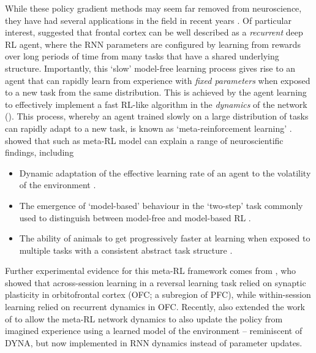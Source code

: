 While these policy gradient methods may seem far removed from neuroscience, they have had several applications in the field in recent years \citep{wang2018prefrontal, jensen2023recurrent, merel2019deep,li2022integrating,song2017reward}.
Of particular interest, \citet{wang2018prefrontal} suggested that frontal cortex can be well described as a \emph{recurrent} deep RL agent, where the RNN parameters are configured by learning from rewards over long periods of time from many tasks that have a shared underlying structure.
Importantly, this `slow' model-free learning process gives rise to an agent that can rapidly learn from experience with \emph{fixed parameters} when exposed to a new task from the same distribution.
This is achieved by the agent learning to effectively implement a fast RL-like algorithm in the \emph{dynamics} of the network ().
This process, whereby an agent trained slowly on a large distribution of tasks can rapidly adapt to a new task, is known as `meta-reinforcement learning' \citep{finn2017model, ritter2018been, duan2016rl, wang2016learning}.
\citet{wang2018prefrontal} showed that such as meta-RL model can explain a range of neuroscientific findings, including
\begin{itemize}
    \item Dynamic adaptation of the effective learning rate of an agent to the volatility of the environment \citep{behrens2007learning}.
    \item The emergence of `model-based' behaviour in the `two-step' task commonly used to distinguish between model-free and model-based RL \citep{miller2017dorsal,daw2011model}.
    \item The ability of animals to get progressively faster at learning when exposed to multiple tasks with a consistent abstract task structure \citep{harlow1949formation}.
\end{itemize}
Further experimental evidence for this meta-RL framework comes from \citet{hattori2023meta}, who showed that across-session learning in a reversal learning task relied on synaptic plasticity in orbitofrontal cortex (OFC; a subregion of PFC), while within-session learning relied on recurrent dynamics in OFC.
Recently, \citet{jensen2023recurrent} also extended the work of \citet{wang2018prefrontal} to allow the meta-RL network dynamics to also update the policy from imagined experience using a learned model of the environment -- reminiscent of DYNA, but now implemented in RNN dynamics instead of parameter updates.


